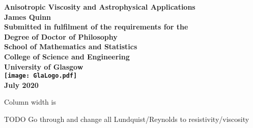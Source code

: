\documentclass[12pt,titlepage,oneside]{book}
\begin{document}
\begin{titlepage}
\centering
\vspace*{3cm}  %
\bfseries\Large
Anisotropic Viscosity and Astrophysical Applications\\
\vspace{3cm}
\normalfont\large
James Quinn\\
\vspace{2cm}
Submitted in fulfilment of the requirements for the\\
Degree of Doctor of Philosophy\\
\vspace{2cm}
School of Mathematics and Statistics\\
College of Science and Engineering\\
University of Glasgow\\
\vspace{1cm}
\texttt{[image: GlaLogo.pdf]}
\\
\vspace{1cm}
July 2020
\end{titlepage}
\frontmatter  %

Column width is \the\columnwidth


\tableofcontents
\listoftables
\listoffigures




\mainmatter %
TODO Go through and change all Lundquist/Reynolds to resistivity/viscosity






\appendix


\backmatter  %
\printbibliography
\end{document}
